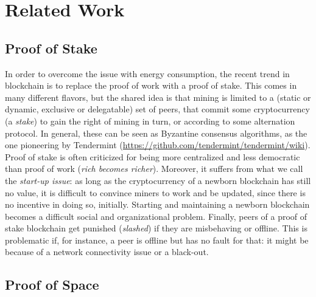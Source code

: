 \section{Related Work}\label{sec:related_work}

\subsection*{Proof of Stake}

In order to overcome the issue with energy consumption, the recent trend in blockchain is to
replace the proof of work with a proof of stake. This comes in many different flavors, but
the shared idea is that mining is limited to a (static or dynamic, exclusive or delegatable)
set of peers, that commit
some cryptocurrency (a \emph{stake}) to gain the right of mining
in turn, or according to some alternation protocol. In general, these can be seen
as Byzantine consensus algorithms, as the one pioneering by
Tendermint (\url{https://github.com/tendermint/tendermint/wiki}).
Proof of stake is often criticized for being more centralized and less democratic than proof of work
(\emph{rich becomes richer}).
Moreover, it suffers from what we call the \emph{start-up issue}: as long as the cryptocurrency
of a newborn blockchain has still no value, it is difficult to convince miners to work and
be updated, since there is no incentive in doing so, initially. Starting and maintaining
a newborn blockchain becomes a difficult social and organizational problem. Finally, peers of
a proof of stake blockchain get punished (\emph{slashed}) if they are misbehaving or offline.
This is problematic if, for instance, a peer is offline but has no fault for that: it might be
because of a network connectivity issue or a black-out.

\subsection*{Proof of Space}

